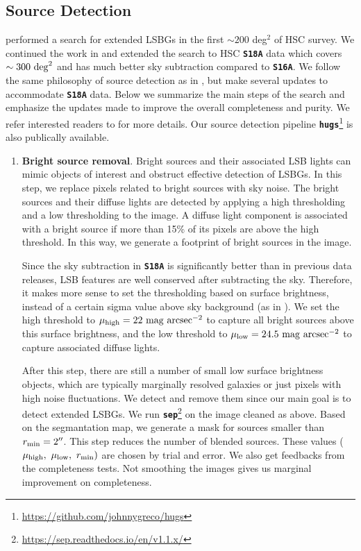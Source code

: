 \documentclass[twocolumn,astrosymb,twocolappendix]{aastex631}
\newcommand{\code}[1]{\textbf{\texttt{#1}}}
\begin{document}
\begin{CJK*}{UTF8}{gbsn}
\subsection{Source Detection}\label{sec:detection}
 performed a search for extended LSBGs in the first $\sim 200$ deg$^2$ of HSC survey. We continued the work in  and extended the search to HSC \code{S18A} data which covers $\sim 300\ \rm{deg}^{2}$ and has much better sky subtraction compared to \code{S16A}. We follow the same philosophy of source detection as in , but make several updates to accommodate \code{S18A} data. Below we summarize the main steps of the search and emphasize the updates made to improve the overall completeness and purity. We refer interested readers to  for more details. Our source detection pipeline \code{hugs}\footnote{\url{https://github.com/johnnygreco/hugs}} is also publically available.

\begin{enumerate}
    \item \textbf{Bright source removal}. Bright sources and their associated LSB lights can mimic objects of interest and obstruct effective detection of LSBGs. In this step, we replace pixels related to bright sources with sky noise. The bright sources and their diffuse lights are detected by applying a high thresholding and a low thresholding to the image. A diffuse light component is associated with a bright source if more than 15\% of its pixels are above the high threshold. In this way, we generate a footprint of bright sources in the image.
    
    Since the sky subtraction in \code{S18A} is significantly better than in previous data releases, LSB features are well conserved after subtracting the sky. Therefore, it makes more sense to set the thresholding based on surface brightness, instead of a certain sigma value above sky background (as in ). We set the high threshold to $\mu_{\rm high} = 22\ \mathrm{mag\ arcsec^{-2}}$ to capture all bright sources above this surface brightness, and the low threshold to $\mu_{\rm low} = 24.5\ \mathrm{mag\ arcsec^{-2}}$ to capture associated diffuse lights. 
    
    After this step, there are still a number of small low surface brightness objects, which are typically marginally resolved galaxies or just pixels with high noise fluctuations. We detect and remove them since our main goal is to detect extended LSBGs. We run \code{sep}\footnote{\url{https://sep.readthedocs.io/en/v1.1.x/}} \citep{Barbary2016} on the image cleaned as above. Based on the segmantation map, we generate a mask for sources smaller than $r_{\rm min} = 2\mbox{$^{\prime\prime}$}$. This step reduces the number of blended sources. These values ($\mu_{\rm high},\ \mu_{\rm low},\ r_{\rm min})$ are chosen by trial and error. We also get feedbacks from the completeness tests. Not smoothing the images gives us marginal improvement on completeness. 


\end{enumerate}
\end{CJK*}
\end{document}
